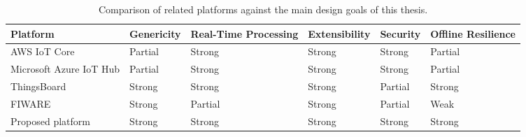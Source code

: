 \begin{table}[htbp]
	\centering
	\caption{Comparison of related platforms against the main design goals of this thesis.}
	\label{tab:related-work-comparison}
	\renewcommand{\arraystretch}{1.15}
	\footnotesize
	\begin{tabularx}{\textwidth}{>{\raggedright\arraybackslash}p{2.8cm} >{\centering\arraybackslash}X >{\centering\arraybackslash}X >{\centering\arraybackslash}X >{\centering\arraybackslash}X >{\centering\arraybackslash}X}
		\toprule
		\textbf{Platform}       & \textbf{Genericity} & \textbf{Real-Time Processing} & \textbf{Extensibility} & \textbf{Security} & \textbf{Offline Resilience} \\
		\midrule
		AWS IoT Core            & Partial             & Strong                        & Strong                 & Strong            & Partial                     \\
		Microsoft Azure IoT Hub & Partial             & Strong                        & Strong                 & Strong            & Partial                     \\
		ThingsBoard             & Strong              & Strong                        & Strong                 & Partial           & Strong                      \\
		FIWARE                  & Strong              & Partial                       & Strong                 & Partial           & Weak                        \\
		Proposed platform       & Strong              & Strong                        & Strong                 & Strong            & Strong                      \\
		\bottomrule
	\end{tabularx}
\end{table}
